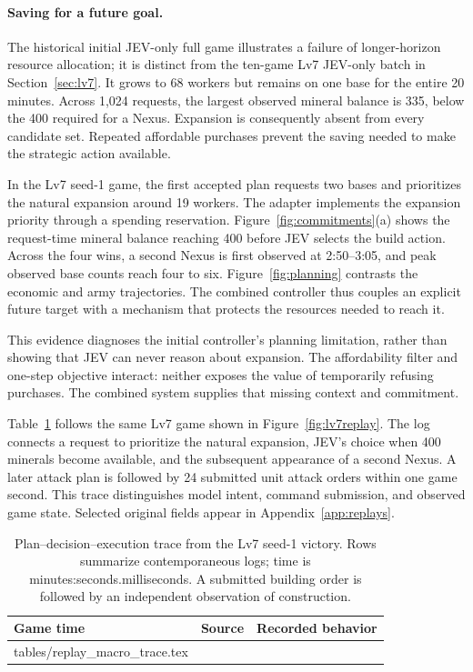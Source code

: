 \documentclass{article}
\makeatletter
\newcommand{\tablerows}[1]{\@@input #1 }
\newcommand{\captionbelowtable}{\normalsize\setlength{\abovecaptionskip}{7pt}\setlength{\belowcaptionskip}{0pt}}
\makeatother
\begin{document}
\paragraph{Saving for a future goal.}
The historical initial JEV-only full game illustrates a failure of longer-horizon resource allocation; it is distinct from the ten-game Lv7 JEV-only batch in Section~\ref{sec:lv7}. It grows to 68 workers but remains on one base for the entire 20 minutes. Across 1,024 requests, the largest observed mineral balance is 335, below the 400 required for a Nexus. Expansion is consequently absent from every candidate set. Repeated affordable purchases prevent the saving needed to make the strategic action available.

In the Lv7 seed-1 game, the first accepted plan requests two bases and prioritizes the natural expansion around 19 workers. The adapter implements the expansion priority through a spending reservation. Figure~\ref{fig:commitments}(a) shows the request-time mineral balance reaching 400 before JEV selects the build action. Across the four wins, a second Nexus is first observed at 2:50--3:05, and peak observed base counts reach four to six. Figure~\ref{fig:planning} contrasts the economic and army trajectories. The combined controller thus couples an explicit future target with a mechanism that protects the resources needed to reach it.

This evidence diagnoses the initial controller's planning limitation, rather than showing that JEV can never reason about expansion. The affordability filter and one-step objective interact: neither exposes the value of temporarily refusing purchases. The combined system supplies that missing context and commitment.

Table~\ref{tab:replaytrace} follows the same Lv7 game shown in Figure~\ref{fig:lv7replay}. The log connects a request to prioritize the natural expansion, JEV's choice when 400 minerals become available, and the subsequent appearance of a second Nexus. A later attack plan is followed by 24 submitted unit attack orders within one game second. This trace distinguishes model intent, command submission, and observed game state. Selected original fields appear in Appendix~\ref{app:replays}.

\begin{table}[t]
\centering\small
\setlength{\tabcolsep}{4pt}
\begin{tabularx}{\linewidth}{llX}
\toprule
Game time & Source & Recorded behavior \\
\midrule
\tablerows{tables/replay_macro_trace.tex}
\bottomrule
\end{tabularx}
\captionbelowtable
\caption{Plan--decision--execution trace from the Lv7 seed-1 victory. Rows summarize contemporaneous logs; time is minutes:seconds.milliseconds. A submitted building order is followed by an independent observation of construction.}
\label{tab:replaytrace}
\end{table}
\end{document}
